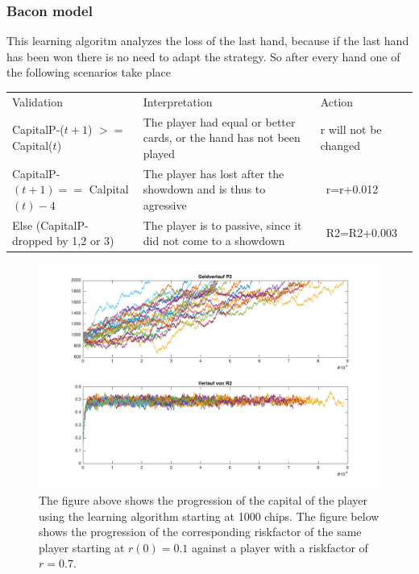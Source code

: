 \documentclass[11pt]{article}
\begin{document}
\subsubsection{Bacon model}
This learning algoritm analyzes the loss of the last hand, because if the last hand has been won there is no need to adapt the strategy. So after every hand one of the following scenarios take place\\
\renewcommand{\arraystretch}{1.4}
\begin{tabular}{ p{6.45cm}   p{5.1cm}  p{2.4cm}}
Validation & Interpretation & Action\\
\addlinespace
CapitalP-($t+1$) $>=$ Capital($t$) &	The player had equal or better cards, or the hand has not been played&
r will not be changed \\
\addlinespace
CapitalP-$(t+1) ==$ Calpital$(t)-4$	&	The player has lost after the showdown and is thus to agressive & \ r=r+0.012\\
\addlinespace
Else (CapitalP- dropped by 1,2 or 3) &	The player is to passive, since it did not come to a showdown & \ R2=R2+0.003\\


\end{tabular}

\begin{figure}[h!]
\centering
\includegraphics[scale=0.6]{Graphics/Janfigure.pdf}
\caption{The figure above shows the progression of the capital of the player using the learning algorithm starting at 1000 chips. The figure below shows the progression of the corresponding riskfactor of the same player starting at $r(0)=0.1$ against a player with a riskfactor of $r=0.7$.\label{Abbildung}}
\end{figure}
\end{document}
